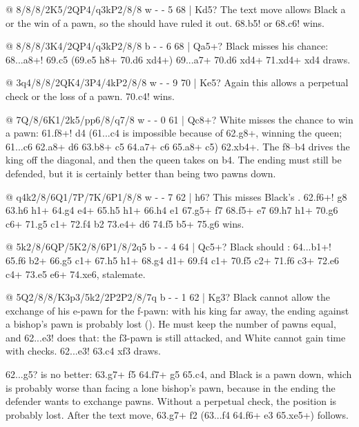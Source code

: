 @ 8/8/8/2K5/2QP4/q3kP2/8/8 w - - 5 68 | Kd5?
The text move allows Black a  or the win of a pawn, so the
 should have ruled it out.
68.\K b5! or 68.\K c6! wins.

@ 8/8/8/3K4/2QP4/q3kP2/8/8 b - - 6 68 | Qa5+?
Black misses his chance: 68...\Q a8+! 69.\K c5 (69.\K e5 \Q h8+ 70.\K d6 \Q xd4+) 69...\Q a7+
70.\K d6 \Q xd4+ 71.\Q xd4+ \K xd4 draws.

@ 3q4/8/8/2QK4/3P4/4kP2/8/8 w - - 9 70 | Ke5?
Again this allows a perpetual check or the loss of a pawn. 70.\K c4! wins.

@ 7Q/8/6K1/2k5/pp6/8/q7/8 w - - 0 61 | Qc8+?
White misses the chance to win a pawn: 61.\Q f8+! \K d4 (61...\K c4 is impossible because of
62.\Q g8+, winning the queen; 61...\K c6 62.\Q a8+ \K d6 63.\Q b8+ \K c5 64.\Q a7+ \K c6 65.\Q a8+
\K c5) 62.\Q xb4+. The  f8--b4 drives the king off the diagonal, and then the
queen takes on b4. The ending must still be defended, but it is certainly better than being two
pawns down.

@ q4k2/8/6Q1/7P/7K/6P1/8/8 w - - 7 62 | h6?
This misses Black's . 62.\Q f6+! \K g8 63.h6 \Q h1+ 64.\K g4
\Q e4+ 65.\K h5 \Q h1+ 66.\Q h4 \Q e1 67.\Q g5+ \K f7 68.\Q f5+ \K e7 69.h7 \Q h1+ 70.\K g6 \Q c6+
71.\K g5 \Q c1+ 72.\Q f4 \Q b2 73.\Q e4+ \K d6 74.\K f5 \Q b5+ 75.\K g6 wins.

@ 5k2/8/6QP/5K2/8/6P1/8/2q5 b - - 4 64 | Qc5+?
Black should : 64...\Q b1+!
65.\K f6 \Q b2+ 66.\K g5 \Q c1+ 67.\K h5 \Q h1+ 68.\K g4 \Q d1+ 69.\K f4 \Q c1+ 70.\K f5 \Q c2+
71.\K f6 \Q c3+ 72.\K e6 \Q c4+ 73.\K e5 \Q e6+ 74.\Q xe6, stalemate.

@ 5Q2/8/8/K3p3/5k2/2P2P2/8/7q b - - 1 62 | Kg3?
Black cannot allow the exchange of his e-pawn for the f-pawn: with his king far away, the ending
against a bishop's pawn is probably lost (). He must keep the number
of pawns equal, and 62...\K e3! does that: the f3-pawn is still attacked, and White cannot gain time
with checks. 62...\K e3! 63.c4 \Q xf3 draws.

62...\K g5? is no better: 63.\Q g7+ \K f5 64.\Q f7+ \K g5 65.c4, and Black is a pawn down, which is
probably worse than facing a lone bishop's pawn, because in the ending the defender wants to
exchange pawns. Without a perpetual check, the position is probably lost. After the text move,
63.\Q g7+ \K f2 (63...\K f4 64.\Q f6+ \K e3 65.\Q xe5+) follows.

